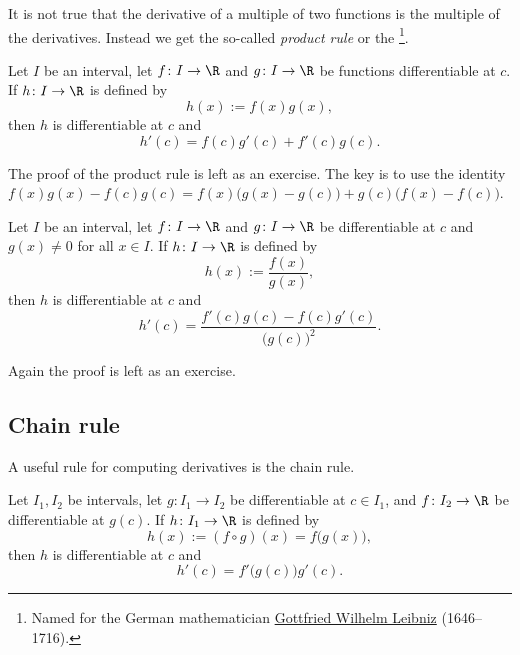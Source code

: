 \documentclass[12pt]{book}
\begin{document}
It is not true that the derivative of a multiple of two functions is
the multiple of the derivatives.
Instead we get the so-called \emph{product
rule} or the \emph{}%
\footnote{Named for the German mathematician
\href{http://en.wikipedia.org/wiki/Leibniz}{Gottfried Wilhelm Leibniz}
(1646--1716).}.

\begin{prop}
Let $I$ be an interval, let
$f \colon I \to \R$ and $g \colon I \to \R$ be 
functions differentiable at $c$.
If $h \colon I \to \R$
is defined by
\begin{equation*}
h(x) := f(x) g(x) ,
\end{equation*}
then $h$ is differentiable at $c$ and
\begin{equation*}
h'(c) = f(c) g'(c) + f'(c) g(c) .
\end{equation*}
\end{prop}

The proof of the product rule is left as an exercise.
The key is to
use the identity
$f(x) g(x) - f(c) g(c) = f(x)\bigl( g(x) - g(c) \bigr) + g(c) \bigl( f(x) -
f(c) \bigr)$.

\begin{prop}
Let $I$ be an interval, let
$f \colon I \to \R$ and $g \colon I \to \R$ be differentiable at $c$
and $g(x) \not= 0$ for all $x \in I$.
If $h \colon I \to \R$
is defined by
\begin{equation*}
h(x) := \frac{f(x)}{g(x)},
\end{equation*}
then $h$ is differentiable at $c$ and
\begin{equation*}
h'(c) = \frac{f'(c) g(c) - f(c) g'(c)}{{\bigl(g(c)\bigr)}^2} .
\end{equation*}
\end{prop}

Again the proof is left as an exercise.

\subsection*{Chain rule}

A useful rule for computing derivatives 
is the chain rule.

\begin{prop}
Let $I_1, I_2$ be intervals, let
$g \colon I_1 \to I_2$ be differentiable at $c \in I_1$,
and
$f \colon I_2 \to \R$ be differentiable at $g(c)$.
If $h \colon I_1 \to \R$
is defined by
\begin{equation*}
h(x) := (f \circ g) (x) = f\bigl(g(x)\bigr) ,
\end{equation*}
then $h$ is differentiable at $c$ and
\begin{equation*}
h'(c) = f'\bigl(g(c)\bigr)g'(c) .
\end{equation*}
\end{prop}
\end{document}
